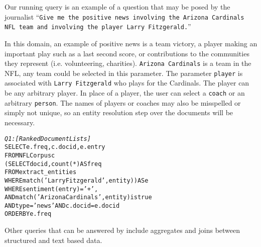 Our running query is an example of a question that may be posed by
the journalist ``{\tt Give me the positive news involving the Arizona Cardinals
NFL team and involving the player Larry Fitzgerald.}''


In this domain, an example of positive news is a team victory, a player
making an important play such as a last second score, or contributions to the
communities they represent (i.e. volunteering, charities).
{\tt Arizona Cardinals} is a team in the NFL, any team could be selected
in this parameter.
The parameter {\tt player} is associated with
{\tt Larry Fitzgerald} who plays for the Cardinals. The player can be any
arbitrary player. In place of a player, the user can select a {\tt coach}
or an arbitrary {\tt person}. The names of players or coaches may also be
misspelled or simply not unique, so an entity resolution step over
the documents will be necessary.



\begin{small}
\begin{alltt}
\textit{Q1: [Ranked Document Lists]}
SELECT e.freq, c.docid,  e.entry
FROM NFLCorpus c
    (SELECT docid, count(*) AS freq
    FROM extract_entities
    WHERE match('LarryFitzgerald',entity)) AS e
WHERE sentiment(entry) = '+',
    AND match('Arizona Cardinals', entity) is true
    AND type = 'news' AND c.docid = e.docid
ORDER BY e.freq
\end{alltt}
\end{small}

Other queries that can be answered by \system include aggregates and joins
between structured and text based data.

